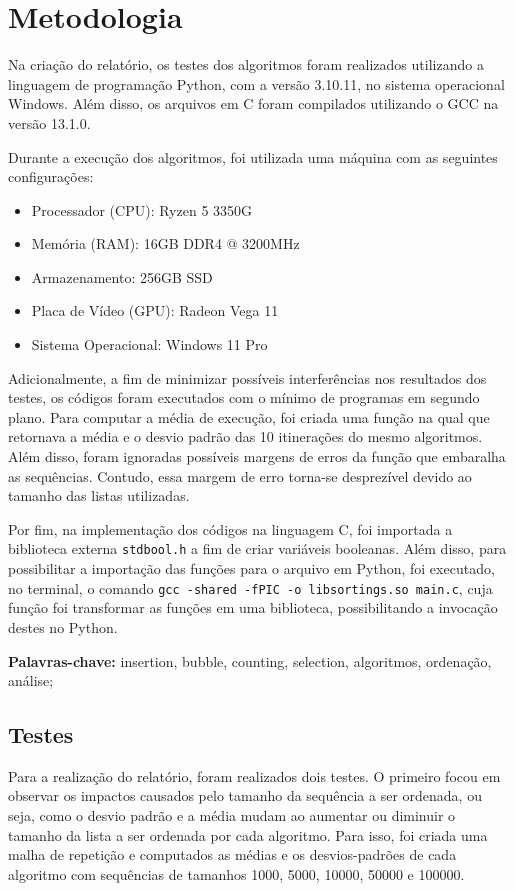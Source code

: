 \documentclass[10pt,a4paper]{article}
\newcommand{\code}[1]{\colorbox{light-gray}{\lstinline{#1}}}
\begin{document}
\section*{Metodologia}
Na criação do relatório, os testes dos algoritmos foram realizados utilizando a linguagem de programação Python, com a versão 3.10.11, no sistema operacional Windows.
Além disso, os arquivos em C foram compilados utilizando o GCC na versão 13.1.0.

Durante a execução dos algoritmos, foi utilizada uma máquina com as seguintes configurações:

\begin{itemize}
\item    Processador (CPU): Ryzen 5 3350G 
\item Memória (RAM): 16GB DDR4 @ 3200MHz
\item Armazenamento: 256GB SSD
\item Placa de Vídeo (GPU): Radeon Vega 11
\item Sistema Operacional: Windows 11 Pro
\end{itemize}
Adicionalmente, a fim de minimizar possíveis interferências nos resultados dos testes, os códigos foram executados com o mínimo de programas em segundo plano. 
Para computar a média de execução, foi criada uma função na qual que retornava a média e o desvio padrão das 10 itinerações do mesmo algoritmos.
Além disso, foram ignoradas possíveis margens de erros da função que embaralha as sequências. Contudo, essa margem de erro torna-se desprezível devido ao tamanho das listas utilizadas.

Por fim, na implementação dos códigos na linguagem C, foi importada a biblioteca externa \code{stdbool.h} a fim de criar variáveis booleanas. Além disso, para possibilitar a importação das funções para o arquivo em Python, foi executado, no terminal, o comando \code{gcc -shared -fPIC -o libsortings.so main.c}, cuja função foi transformar as funções em uma biblioteca, possibilitando a invocação destes no Python.

\noindent\textbf{Palavras-chave:} insertion, bubble, counting, selection, algoritmos, ordenação, análise;

\subsection*{Testes}
    Para a realização do relatório, foram realizados dois testes. 
    O primeiro focou em observar os impactos causados pelo tamanho da sequência a ser ordenada, ou seja, como o desvio padrão e a média mudam ao aumentar ou diminuir o tamanho da lista a ser ordenada por cada algoritmo. 
    Para isso, foi criada uma malha de repetição e computados as médias e os desvios-padrões de cada algoritmo com sequências de tamanhos 1000, 5000, 10000, 50000 e 100000.
    
\end{document}
